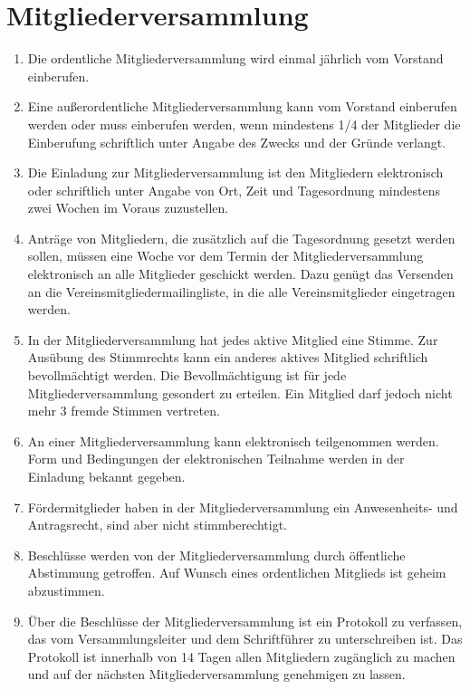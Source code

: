 \documentclass[ngerman]{article}
\begin{document}
\section{Mitgliederversammlung}

\begin{enumerate}
  \item Die ordentliche Mitgliederversammlung wird einmal jährlich vom Vorstand einberufen.
  \item Eine außerordentliche Mitgliederversammlung kann vom Vorstand einberufen werden oder muss  einberufen werden, wenn mindestens 1/4 der Mitglieder die Einberufung schriftlich unter Angabe des Zwecks und der Gründe verlangt.
  \item Die Einladung zur Mitgliederversammlung ist den Mitgliedern elektronisch oder schriftlich unter Angabe von Ort, Zeit und Tagesordnung mindestens zwei Wochen im Voraus zuzustellen.
  \item Anträge von Mitgliedern, die zusätzlich auf die Tagesordnung gesetzt werden sollen, müssen eine Woche vor dem Termin der Mitgliederversammlung elektronisch an alle Mitglieder geschickt werden. Dazu genügt das Versenden an die Vereinsmitgliedermailingliste, in die alle Vereinsmitglieder eingetragen werden.
  \item In der Mitgliederversammlung hat jedes aktive Mitglied eine Stimme. Zur Ausübung des Stimmrechts kann ein anderes aktives Mitglied schriftlich bevollmächtigt werden. Die Bevollmächtigung ist für jede Mitgliederversammlung gesondert zu erteilen. Ein Mitglied darf jedoch nicht mehr 3 fremde Stimmen vertreten.
  \item An einer Mitgliederversammlung kann elektronisch teilgenommen werden.
  Form und Bedingungen der elektronischen Teilnahme werden in der Einladung bekannt gegeben.
  \item Fördermitglieder haben in der Mitgliederversammlung ein Anwesenheits- und Antragsrecht, sind aber nicht stimmberechtigt.
  \item Beschlüsse werden von der Mitgliederversammlung durch öffentliche Abstimmung getroffen.
  Auf Wunsch eines ordentlichen Mitglieds ist geheim abzustimmen.
  \item Über die Beschlüsse der Mitgliederversammlung ist ein Protokoll zu verfassen, das vom Versammlungsleiter und dem Schriftführer zu unterschreiben ist.
  Das Protokoll ist innerhalb von 14 Tagen allen Mitgliedern zugänglich zu machen und auf der nächsten Mitgliederversammlung genehmigen zu lassen.
\end{enumerate}
\end{document}
